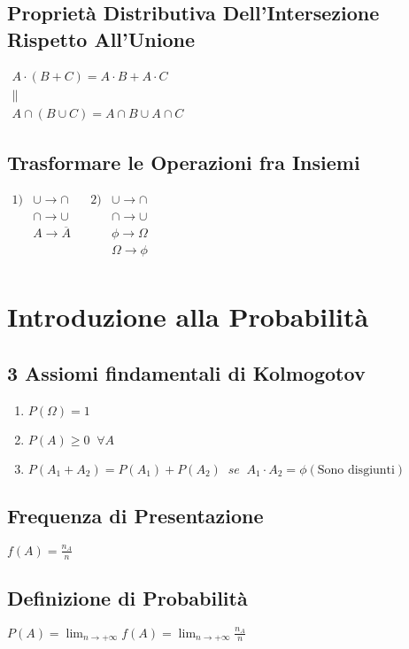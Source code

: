 \documentclass{article}
\begin{document}
\subsection{Proprietà Distributiva Dell’Intersezione Rispetto All’Unione}
$\begin{matrix}
A \cdot (B + C) = A \cdot B + A \cdot C \\
\parallel \\
A \cap (B \cup C) = A \cap B \cup A \cap C
\end{matrix}$

\subsection{Trasformare le Operazioni fra Insiemi}
$\begin{matrix}
1) & \cup \rightarrow \cap && 2) & \cup \rightarrow \cap \\
& \cap \rightarrow \cup && & \cap \rightarrow \cup \\
& A \rightarrow \overline{A} && & \phi \rightarrow \Omega \\
&  && & \Omega \rightarrow \phi \\
\end{matrix}$

\section{Introduzione alla Probabilità}

\subsection{3 Assiomi findamentali di Kolmogotov}

\begin{enumerate}
    \item $P\left(\Omega\right) = 1$
    \item $P(A) \geq 0 \;\;\forall A$
    \item $P(A_1 +A_2) = P(A_1) + P(A_2) \; \; se \;\; A_1 \cdot A_2 = \phi \left(\text{Sono disgiunti}\right)$
\end{enumerate}

\subsection{Frequenza di Presentazione}
$f(A) = \frac{n_A}{n}$

\subsection{Definizione di Probabilità}
$P(A) = \lim_{n \to +\infty} f(A) = \lim_{n \to +\infty} \frac{n_A}{n}$
\end{document}
